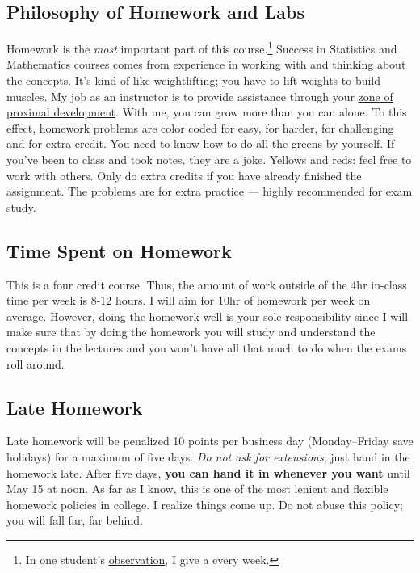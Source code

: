 \documentclass[12pt]{article}
\begin{document}
\subsection*{Philosophy of Homework and Labs}


Homework is the \textit{most} important part of this course.\footnote{In one student's \href{http://www.ratemyprofessors.com/ShowRatings.jsp?tid=1951051}{observation}, I give a  every week.} Success in Statistics and Mathematics courses comes from experience in working with and thinking about the concepts. It's kind of like weightlifting; you have to lift weights to build muscles. My job as an instructor is to provide assistance through your \href{http://en.wikipedia.org/wiki/Zone_of_proximal_development}{zone of proximal development}. With me, you can grow more than you can alone. To this effect, homework problems are color coded  for easy,  for harder,  for challenging and  for extra credit. You need to know how to do all the greens by yourself. If you've been to class and took notes, they are a joke. Yellows and reds: feel free to work with others. Only do extra credits if you have already finished the assignment. The \qu{[Optional]} problems are for extra practice --- highly recommended for exam study.

\subsection*{Time Spent on Homework }

This is a four credit course. Thus, the amount of work outside of the 4hr in-class time per week is 8-12 hours. I will aim for 10hr of homework per week on average. However, doing the homework well is your sole responsibility since I will make sure that by doing the homework you will study and understand the concepts in the lectures and you won't have all that much to do when the exams roll around.

\subsection*{Late Homework}

Late homework will be penalized 10 points per business day (Monday--Friday save holidays) for a maximum of five days. \textit{Do not ask for extensions}; just hand in the homework late. After five days, \textbf{you can hand it in whenever you want} until May 15 at noon. As far as I know, this is one of the most lenient and flexible homework policies in college. I realize things come up. Do not abuse this policy; you will fall far, far behind.
\end{document}
